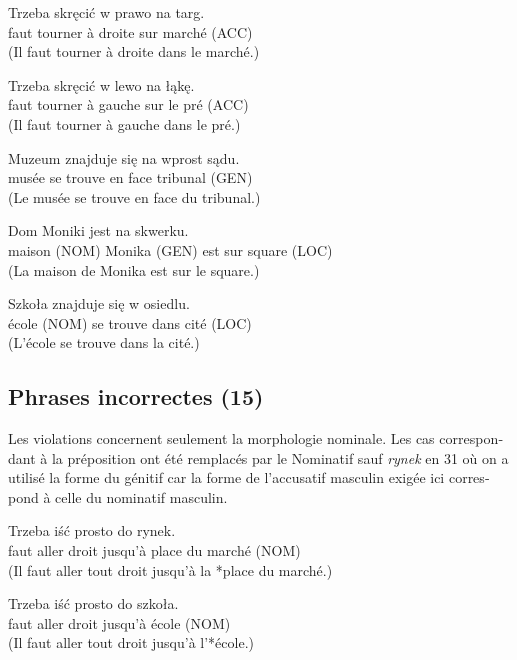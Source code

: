 \documentclass[output=paper]{langscibook}
\begin{document}
\begin{otherlanguage}{french}
\begin{paperappendix}
\begin{exe}
\gll Trzeba   skręcić   w prawo   na   targ.\\
    faut     tourner   à droite     sur   {marché (ACC)}\\
\glt (Il faut tourner à droite dans le marché.)

\gll Trzeba   skręcić   w lewo     na   łąkę.\\
      faut     tourner   à gauche   sur   {le pré (ACC)}\\
\glt (Il faut tourner à gauche dans le pré.)

\gll Muzeum   znajduje się   na wprost   sądu.\\
     musée   se trouve   en face     {tribunal (GEN)}\\
\glt (Le musée se trouve en face du tribunal.)

\gll Dom     Moniki     jest   na   skwerku.\\
    {maison (NOM)} {Monika (GEN)}  est   sur   {square (LOC)}\\
\glt (La maison de Monika est sur le square.)

\gll Szkoła     znajduje się   w   osiedlu.\\
      {école (NOM)} se trouve   dans   {cité (LOC)}\\
\glt (L’école se trouve dans la cité.)
\end{exe}

\subsection{Phrases incorrectes (15)}

Les violations concernent seulement la morphologie nominale. Les cas correspondant à la préposition ont été remplacés par le Nominatif sauf \textit{rynek} en 31 où on a utilisé la forme du génitif car la forme de l’accusatif masculin exigée ici correspond à celle du nominatif masculin.

\begin{exe}
\gll Trzeba   iść   prosto     do     rynek.\\
      faut     aller  droit     jusqu’à     {place du marché (NOM)}\\
\glt (Il faut aller tout droit jusqu’à la *place du marché.)

\gll Trzeba   iść   prosto     do     szkoła.\\
      faut     aller  droit     jusqu’à     {école (NOM)}\\
\glt (Il faut aller tout droit jusqu’à l’*école.)


\end{exe}
\end{paperappendix}
\end{otherlanguage}
\end{document}
